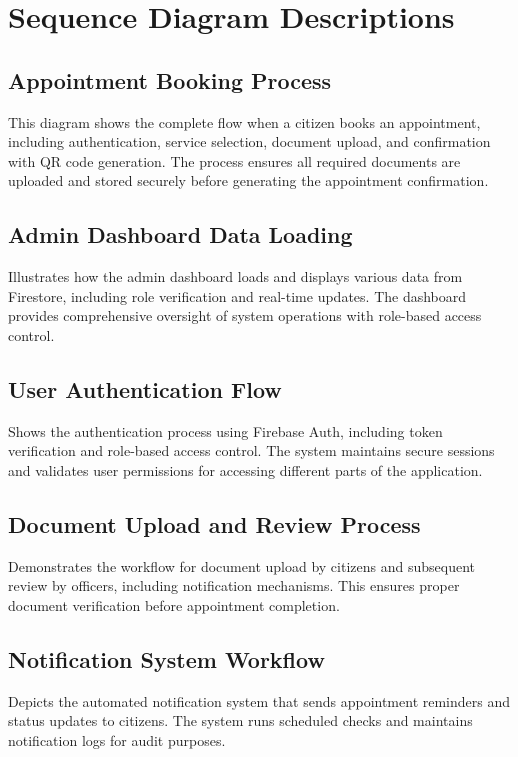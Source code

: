 \documentclass[12pt,a4paper]{article}
\begin{document}
\newpage

\section{Sequence Diagram Descriptions}

\subsection{Appointment Booking Process}
This diagram shows the complete flow when a citizen books an appointment, including authentication, service selection, document upload, and confirmation with QR code generation. The process ensures all required documents are uploaded and stored securely before generating the appointment confirmation.

\subsection{Admin Dashboard Data Loading}
Illustrates how the admin dashboard loads and displays various data from Firestore, including role verification and real-time updates. The dashboard provides comprehensive oversight of system operations with role-based access control.

\subsection{User Authentication Flow}
Shows the authentication process using Firebase Auth, including token verification and role-based access control. The system maintains secure sessions and validates user permissions for accessing different parts of the application.

\subsection{Document Upload and Review Process}
Demonstrates the workflow for document upload by citizens and subsequent review by officers, including notification mechanisms. This ensures proper document verification before appointment completion.

\subsection{Notification System Workflow}
Depicts the automated notification system that sends appointment reminders and status updates to citizens. The system runs scheduled checks and maintains notification logs for audit purposes.
\end{document}
